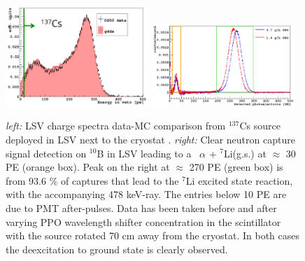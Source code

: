 \begin{figure}[htbp]
\centering
\includegraphics[width=0.48\textwidth]{./Figures/137Cs_Veto_Paolo_G4DS_UCLA.png}
\includegraphics[width=0.48\textwidth]{./Figures/AmBe_LSV_VetoPaper.png}
\caption{\textit{left:} LSV charge spectra data-MC comparison from $^{137}$Cs source deployed in LSV next to the cryostat \cite{DS50:G4DS:paper}.
\textit{right:} Clear neutron capture signal detection on $^{10}$B in LSV leading to a \enbortengroundalpha\ $\alpha$ + $^7$Li(g.s.) at $\approx$ 30 PE (orange box). Peak on the right at $\approx$ 270 PE (green box) is from 93.6 \% of captures that lead to the $^7$Li excited state reaction, with the accompanying 478 keV-ray. The entries below 10 PE are due to PMT after-pulses. Data has been taken before and after varying PPO wavelength shifter concentration in the scintillator with the source rotated 70 cm away from the cryostat. In both cases the deexcitation to ground state is clearly observed.\cite{Agnes:2015qyz}
\label{fig:LSV:Calib}} 
\end{figure}